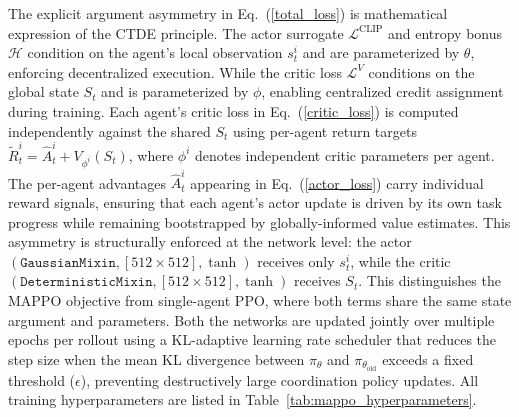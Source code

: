 \documentclass[a4paper,fleqn]{cas-dc}
\begin{document}
The explicit argument asymmetry in Eq.~(\ref{total_loss}) is mathematical expression of the CTDE principle. The actor surrogate $\mathcal{L}^{\text{CLIP}}$ and entropy bonus $\mathcal{H}$ condition on the agent's local observation $s_t^i$ and are parameterized by $\theta$, enforcing decentralized execution. While the critic loss $\mathcal{L}^{V}$ conditions on the global state $S_t$ and is parameterized by $\phi$, enabling centralized credit assignment during training. Each agent's critic loss in Eq.~(\ref{critic_loss}) is computed independently against the shared $S_t$ using per-agent return targets $\tilde{R}_t^i = \hat{A}_t^i + V_{\phi^i}(S_t)$, where $\phi^i$ denotes independent critic parameters per agent. The per-agent advantages $\hat{A}_t^i$ appearing in Eq.~(\ref{actor_loss}) carry individual reward signals, ensuring that each agent's actor update is driven by its own task progress while remaining bootstrapped by globally-informed value estimates. This asymmetry is structurally enforced at the network level: the actor $(\texttt{GaussianMixin}, [512 \times 512], \tanh)$ receives only $s_t^i$, while the critic $(\texttt{DeterministicMixin}, [512 \times 512], \tanh)$ receives $S_t$. This distinguishes the MAPPO objective from single-agent PPO, where both terms share the same state argument and parameters. Both the networks are updated jointly over multiple epochs per rollout using a KL-adaptive learning rate scheduler that reduces the step size when the mean KL divergence between $\pi_{\theta}$ and $\pi_{\theta_{\text{old}}}$ exceeds a fixed threshold ($\epsilon$), preventing destructively large coordination policy updates. All training hyperparameters are listed in Table~\ref{tab:mappo_hyperparameters}.
\end{document}
